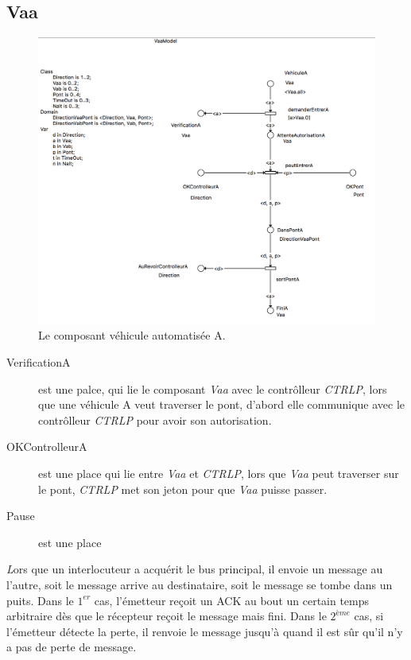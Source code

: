 \documentclass[a4paper,11pt]{report}
\begin{document}
\subsection{Vaa}
	\begin{figure}[!htbp]
		\centering
		\includegraphics[width = 15cm]{vaaModel.png}
		\caption{Le composant véhicule automatisée A.}
	\end{figure}
	
	\begin{description}
		\item[VerificationA] est une palce, qui lie le composant \textit{Vaa} avec le contrôlleur \textit{CTRLP}, lors que une véhicule A veut traverser le pont, d'abord elle communique avec le contrôlleur \textit{CTRLP} pour avoir son autorisation.
		\item[OKControlleurA] est une place qui lie entre \textit{Vaa} et \textit{CTRLP}, lors que \textit{Vaa} peut traverser sur le pont, \textit{CTRLP} met son jeton pour que \textit{Vaa} puisse passer.
		\item[Pause] est une place
	\end{description}		
	
	{\huge \itshape L}ors que un interlocuteur a acquérit le bus principal, il envoie un message au l'autre, soit le message arrive au destinataire, soit le message se tombe dans un puits. Dans le $1^{er}$ cas, l'émetteur reçoit un ACK au bout un certain temps arbitraire dès que le récepteur reçoit le message mais fini. Dans le $2^{ème}$ cas, si l'émetteur détecte la perte, il renvoie le message jusqu'à quand il est sûr qu'il n'y a pas de perte de message.
	
\end{document}
